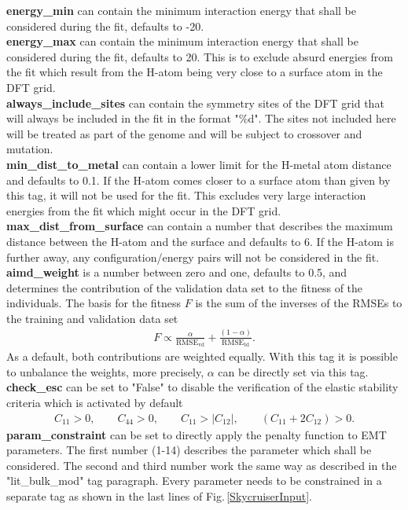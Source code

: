 \documentclass[twoside, 11pt, titlepage, captions=nooneline, a4paper, headsepline]{scrbook}%
\newcommand{\9}{\mathrm}
\newcommand{\0}{\,\mathrm}
\begin{document}
\textbf{energy\_min} can contain the minimum interaction energy that shall be considered during the fit, defaults to -20.\\
\textbf{energy\_max} can contain the minimum interaction energy that shall be considered during the fit, defaults to 20. This is to exclude absurd energies from the fit which result from the H-atom being very close to a surface atom in the DFT grid.\\
\textbf{always\_include\_sites} can contain the symmetry sites of the DFT grid that will always be included in the fit in the format "\%d". The sites not included here will be treated as part of the genome and will be subject to crossover and mutation.\\
\textbf{min\_dist\_to\_metal} can contain a lower limit for the H-metal atom distance and defaults to 0.1. If the H-atom comes closer to a surface atom than given by this tag, it will not be used for the fit. This excludes very large interaction energies from the fit which might occur in the DFT grid.\\
\textbf{max\_dist\_from\_surface} can contain a number that describes the maximum distance between the H-atom and the surface and defaults to 6. If the H-atom is further away, any configuration/energy pairs will not be considered in the fit.\\
\textbf{aimd\_weight} is a number between zero and one, defaults to 0.5, and determines the contribution of the validation data set to the fitness of the individuals. The basis for the fitness $F$ is the sum of the inverses of the RMSEs to the training and validation data set
\begin{align*}
	F \propto \frac{\alpha}{\9{RMSE}_\9{vd}} + \frac{(1-\alpha)}{\9{RMSE}_\9{td}}.
\end{align*}
As a default, both contributions are weighted equally. With this tag it is possible to unbalance the weights, more precisely, $\alpha$ can be directly set via this tag.\\
\textbf{check\_esc} can be set to "False" to disable the verification of the elastic stability criteria which is activated by default
\begin{align*}
	C_{11} > 0,\qquad C_{44} > 0,\qquad C_{11} > |C_{12}|,\qquad (C_{11} + 2C_{12}) > 0.
\end{align*}
\textbf{param\_constraint} can be set to directly apply the penalty function to EMT parameters. The first number (1-14) describes the parameter which shall be considered. The second and third number work the same way as described in the "lit\_bulk\_mod" tag paragraph. Every parameter needs to be constrained in a separate tag as shown in the last lines of Fig.\,\ref{SkycruiserInput}.
\end{document}
